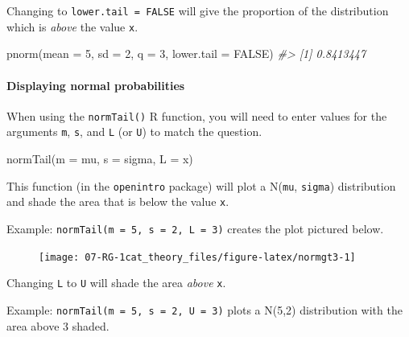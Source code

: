 \documentclass[
]{report}
\newenvironment{Shaded}{\begin{snugshade}}{\end{snugshade}}
\newcommand{\AttributeTok}[1]{\textcolor[rgb]{0.77,0.63,0.00}{#1}}
\newcommand{\CommentTok}[1]{\textcolor[rgb]{0.56,0.35,0.01}{\textit{#1}}}
\newcommand{\ConstantTok}[1]{\textcolor[rgb]{0.00,0.00,0.00}{#1}}
\newcommand{\DecValTok}[1]{\textcolor[rgb]{0.00,0.00,0.81}{#1}}
\newcommand{\FunctionTok}[1]{\textcolor[rgb]{0.00,0.00,0.00}{#1}}
\newcommand{\NormalTok}[1]{#1}
\begin{document}
Changing to \texttt{lower.tail\ =\ FALSE} will give the proportion of the distribution which is \emph{above} the value \texttt{x}.

\begin{Shaded}
\begin{Highlighting}[]
\FunctionTok{pnorm}\NormalTok{(}\AttributeTok{mean =} \DecValTok{5}\NormalTok{, }\AttributeTok{sd =} \DecValTok{2}\NormalTok{, }\AttributeTok{q =} \DecValTok{3}\NormalTok{, }\AttributeTok{lower.tail =} \ConstantTok{FALSE}\NormalTok{)}
\CommentTok{\#\textgreater{} [1] 0.8413447}
\end{Highlighting}
\end{Shaded}

\hypertarget{displaying-normal-probabilities}{%
\paragraph*{Displaying normal probabilities}\label{displaying-normal-probabilities}}

When using the \texttt{normTail()} R function, you will need to enter values for the arguments \texttt{m}, \texttt{s}, and \texttt{L} (or \texttt{U}) to match the question.

\begin{Shaded}
\begin{Highlighting}[]
\FunctionTok{normTail}\NormalTok{(}\AttributeTok{m =}\NormalTok{ mu, }\AttributeTok{s =}\NormalTok{ sigma, }\AttributeTok{L =}\NormalTok{ x)}
\end{Highlighting}
\end{Shaded}

This function (in the \texttt{openintro} package) will plot a N(\texttt{mu}, \texttt{sigma}) distribution and shade the area that is below the value \texttt{x}.

Example: \texttt{normTail(m\ =\ 5,\ s\ =\ 2,\ L\ =\ 3)} creates the plot pictured below.

\begin{figure}

{\centering \texttt{[image: 07-RG-1cat\_theory\_files/figure-latex/normgt3-1]} 

}

\end{figure}

Changing \texttt{L} to \texttt{U} will shade the area \emph{above} \texttt{x}.

Example: \texttt{normTail(m\ =\ 5,\ s\ =\ 2,\ U\ =\ 3)} plots a N(5,2) distribution with the area above 3 shaded.
\end{document}
